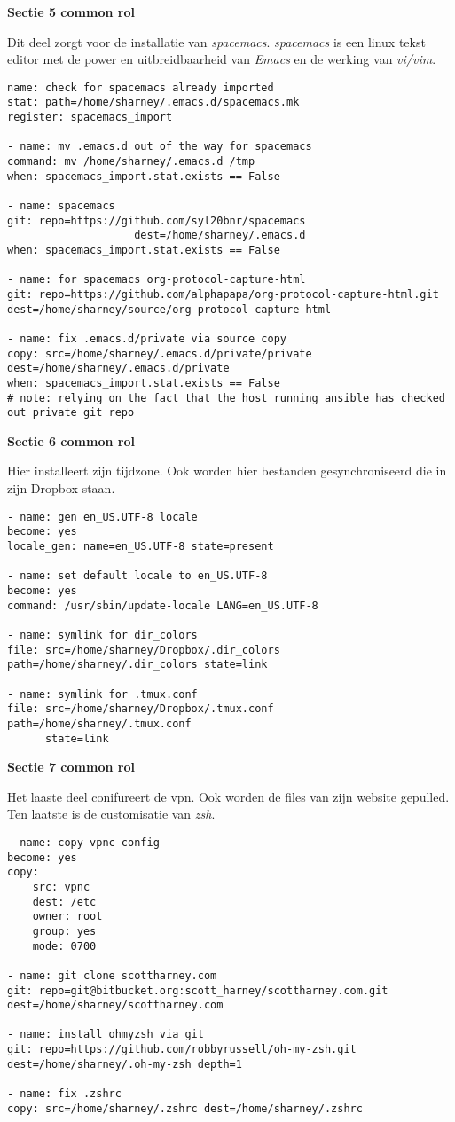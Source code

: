 \textbf{Sectie 5 common rol}

Dit deel zorgt voor de installatie van \textit{spacemacs}. \textit{spacemacs} is een linux tekst editor met de power en uitbreidbaarheid van \textit{Emacs} en de werking van \textit{vi/vim}.
\begin{lstlisting}[basicstyle=\small]
 name: check for spacemacs already imported
stat: path=/home/sharney/.emacs.d/spacemacs.mk
register: spacemacs_import

- name: mv .emacs.d out of the way for spacemacs
command: mv /home/sharney/.emacs.d /tmp
when: spacemacs_import.stat.exists == False

- name: spacemacs
git: repo=https://github.com/syl20bnr/spacemacs 
					dest=/home/sharney/.emacs.d 
when: spacemacs_import.stat.exists == False

- name: for spacemacs org-protocol-capture-html
git: repo=https://github.com/alphapapa/org-protocol-capture-html.git dest=/home/sharney/source/org-protocol-capture-html

- name: fix .emacs.d/private via source copy
copy: src=/home/sharney/.emacs.d/private/private 
dest=/home/sharney/.emacs.d/private
when: spacemacs_import.stat.exists == False
# note: relying on the fact that the host running ansible has checked out private git repo
\end{lstlisting}

\textbf{Sectie 6 common rol}

Hier installeert \autocite{commonscottharney} zijn tijdzone. Ook worden hier bestanden gesynchroniseerd die in zijn Dropbox staan.
\begin{lstlisting}[basicstyle=\small]
- name: gen en_US.UTF-8 locale
become: yes
locale_gen: name=en_US.UTF-8 state=present

- name: set default locale to en_US.UTF-8
become: yes
command: /usr/sbin/update-locale LANG=en_US.UTF-8

- name: symlink for dir_colors
file: src=/home/sharney/Dropbox/.dir_colors 
path=/home/sharney/.dir_colors state=link

- name: symlink for .tmux.conf
file: src=/home/sharney/Dropbox/.tmux.conf path=/home/sharney/.tmux.conf 
	  state=link
\end{lstlisting}

\newpage
\textbf{Sectie 7 common rol}

Het laaste deel conifureert de vpn. Ook worden de files van zijn website gepulled. Ten laatste is de customisatie van \textit{zsh}.
\begin{lstlisting}[basicstyle=\small]
- name: copy vpnc config
become: yes
copy:
    src: vpnc
    dest: /etc
    owner: root
    group: yes
    mode: 0700 

- name: git clone scottharney.com
git: repo=git@bitbucket.org:scott_harney/scottharney.com.git
dest=/home/sharney/scottharney.com

- name: install ohmyzsh via git
git: repo=https://github.com/robbyrussell/oh-my-zsh.git  
dest=/home/sharney/.oh-my-zsh depth=1 

- name: fix .zshrc
copy: src=/home/sharney/.zshrc dest=/home/sharney/.zshrc
\end{lstlisting}

